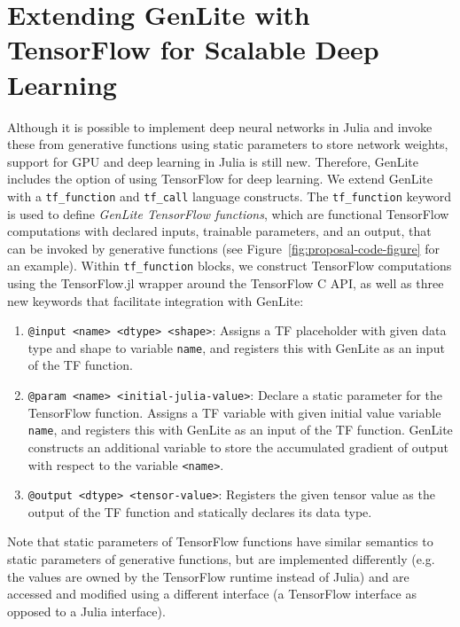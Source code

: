 \section{Extending GenLite with TensorFlow for Scalable Deep Learning}



Although it is possible to implement deep neural networks in Julia and invoke these from generative functions using static parameters to store network weights, support for GPU and deep learning in Julia is still new.
Therefore, GenLite includes the option of using TensorFlow for deep learning.
We extend GenLite with a \texttt{tf\_function} and \texttt{tf\_call} language constructs.
The \texttt{tf\_function} keyword is used to define \emph{GenLite TensorFlow functions}, which are functional TensorFlow computations with declared inputs, trainable parameters, and an output, that can be invoked by generative functions (see Figure~\ref{fig:proposal-code-figure} for an example).
Within \texttt{tf\_function} blocks, we construct TensorFlow computations using the TensorFlow.jl \cite{?} wrapper around the TensorFlow C API, as well as three new keywords that facilitate integration with GenLite:
\begin{enumerate}
\item \texttt{@input <name> <dtype> <shape>}:
Assigns a TF placeholder with given data type and shape to variable \texttt{name}, and registers this with GenLite as an input of the TF function.
\item \texttt{@param <name> <initial-julia-value>}:
Declare a static parameter for the TensorFlow function.
Assigns a TF variable with given initial value variable \texttt{name}, and registers this with GenLite as an input of the TF function.
GenLite constructs an additional variable to store the accumulated gradient of output with respect to the variable \texttt{<name>}.
\item \texttt{@output <dtype> <tensor-value>}:
Registers the given tensor value as the output of the TF function and statically declares its data type.
\end{enumerate}
Note that static parameters of TensorFlow functions have similar semantics to static parameters of generative functions, but are implemented differently (e.g. the values are owned by the TensorFlow runtime instead of Julia) and are accessed and modified using a different interface (a TensorFlow interface as opposed to a Julia interface).

